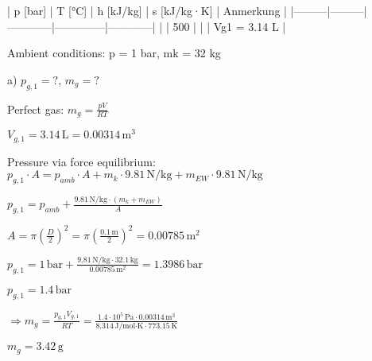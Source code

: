 | p [bar] | T [°C] | h [kJ/kg] | s [kJ/kg·K] | Anmerkung |  
|---------|---------|------------|--------------|------------|  
|         | 500     |            |              | Vg1 = 3.14 L |  

Ambient conditions: p = 1 bar, mk = 32 kg  

a) \( p_{g,1} = ? \), \( m_g = ? \)  

Perfect gas: \( m_g = \frac{p V}{R T} \)  

\( V_{g,1} = 3.14 \, \text{L} = 0.00314 \, \text{m}^3 \)  

Pressure via force equilibrium:  
\( p_{g,1} \cdot A = p_{amb} \cdot A + m_k \cdot 9.81 \, \text{N/kg} + m_{EW} \cdot 9.81 \, \text{N/kg} \)  

\( p_{g,1} = p_{amb} + \frac{9.81 \, \text{N/kg} \cdot (m_k + m_{EW})}{A} \)  

\( A = \pi \left(\frac{D}{2}\right)^2 = \pi \left(\frac{0.1 \, \text{m}}{2}\right)^2 = 0.00785 \, \text{m}^2 \)  

\( p_{g,1} = 1 \, \text{bar} + \frac{9.81 \, \text{N/kg} \cdot 32.1 \, \text{kg}}{0.00785 \, \text{m}^2} = 1.3986 \, \text{bar} \)  

\( p_{g,1} = 1.4 \, \text{bar} \)  

\( \Rightarrow m_g = \frac{p_{g,1} V_{g,1}}{R T} = \frac{1.4 \cdot 10^5 \, \text{Pa} \cdot 0.00314 \, \text{m}^3}{8.314 \, \text{J/mol·K} \cdot 773.15 \, \text{K}} \)  

\( m_g = 3.42 \, \text{g} \)